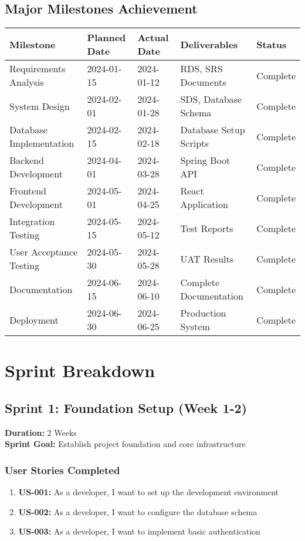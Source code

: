 \documentclass[12pt,a4paper]{article}
\begin{document}
\subsection{Major Milestones Achievement}
\begin{longtable}{|p{3cm}|p{3cm}|p{3cm}|p{3cm}|p{2cm}|}
\hline
\rowcolor{lightgray}
\textbf{Milestone} & \textbf{Planned Date} & \textbf{Actual Date} & \textbf{Deliverables} & \textbf{Status} \\
\hline
Requirements Analysis & 2024-01-15 & 2024-01-12 & RDS, SRS Documents & \cellcolor{completedgreen}Complete \\
\hline
System Design & 2024-02-01 & 2024-01-28 & SDS, Database Schema & \cellcolor{completedgreen}Complete \\
\hline
Database Implementation & 2024-02-15 & 2024-02-18 & Database Setup Scripts & \cellcolor{completedgreen}Complete \\
\hline
Backend Development & 2024-04-01 & 2024-03-28 & Spring Boot API & \cellcolor{completedgreen}Complete \\
\hline
Frontend Development & 2024-05-01 & 2024-04-25 & React Application & \cellcolor{completedgreen}Complete \\
\hline
Integration Testing & 2024-05-15 & 2024-05-12 & Test Reports & \cellcolor{completedgreen}Complete \\
\hline
User Acceptance Testing & 2024-05-30 & 2024-05-28 & UAT Results & \cellcolor{completedgreen}Complete \\
\hline
Documentation & 2024-06-15 & 2024-06-10 & Complete Documentation & \cellcolor{completedgreen}Complete \\
\hline
Deployment & 2024-06-30 & 2024-06-25 & Production System & \cellcolor{completedgreen}Complete \\
\hline
\end{longtable}

\section{Sprint Breakdown}

\subsection{Sprint 1: Foundation Setup (Week 1-2)}
\textbf{Duration:} 2 Weeks \\
\textbf{Sprint Goal:} Establish project foundation and core infrastructure

\subsubsection{User Stories Completed}
\begin{enumerate}
    \item \textbf{US-001:} As a developer, I want to set up the development environment
    \item \textbf{US-002:} As a developer, I want to configure the database schema
    \item \textbf{US-003:} As a developer, I want to implement basic authentication
\end{enumerate}
\end{document}
